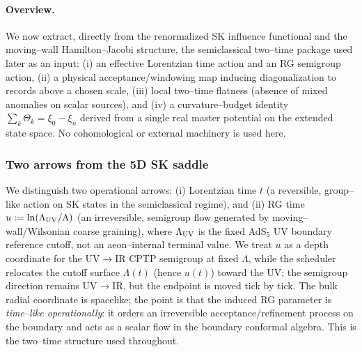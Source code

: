 \documentclass[10pt]{article}
\theoremstyle{definition}
\theoremstyle{plain}
\begin{document}
\paragraph{Overview.}\label{par:uom-main-093}
We now extract, directly from the renormalized SK influence functional and the moving--wall Hamilton--Jacobi
structure, the semiclassical two--time package used later as an input: (i) an effective Lorentzian time action
and an RG semigroup action, (ii) a physical acceptance/windowing map inducing diagonalization to records above
a chosen scale, (iii) local two--time flatness (absence of mixed anomalies on scalar sources), and (iv) a
curvature--budget identity $\sum_k\Theta_k=\xi_0-\xi_n$ derived from a single real master potential on the
extended state space. No cohomological or external machinery is used here.

\subsubsection{Two arrows from the 5D SK saddle}
\label{subsubsec:two-times-arrows}
We distinguish two operational arrows:
(i) Lorentzian time $t$ (a reversible, group--like action on SK states in the semiclassical regime), and
(ii) RG time $u:=\ln(\Lambda_{\rm UV}/\Lambda)$ (an irreversible, semigroup flow generated by moving--wall/Wilsonian
coarse graining), where $\Lambda_{\rm UV}$ is the fixed AdS$_5$ UV boundary reference cutoff, not an
aeon--internal terminal value. We treat $u$ as a depth coordinate for the UV$\to$IR CPTP semigroup at fixed
$\Lambda$, while the scheduler relocates the cutoff surface $\Lambda(t)$ (hence $u(t)$) toward the UV;
the semigroup direction remains UV$\to$IR, but the endpoint is moved tick by tick.
The bulk radial coordinate is spacelike; the point is that the induced RG parameter is \emph{time--like
operationally}: it orders an irreversible acceptance/refinement process on the boundary and acts as a scalar
flow in the boundary conformal algebra. This is the two--time structure used throughout.
\end{document}
